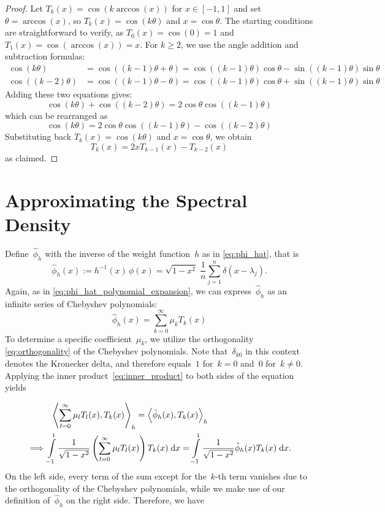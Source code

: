 \begin{proof}
Let $T_k(x) = \cos(k \arccos(x))$ for $x \in [-1, 1]$ and set $\theta = \arccos(x)$, so $\mbox{$T_k(x) = \cos(k\theta)$}$ and $x = \cos\theta$. The starting conditions are straightforward to verify, as $T_0(x) = \cos(0) = 1$ and $T_1(x) = \cos(\arccos(x)) = x$. For $k \geq 2$, we use the angle addition and subtraction formulas:
\begin{align*}
\cos(k\theta) &= \cos((k-1)\theta + \theta) = \cos((k-1)\theta)\cos\theta - \sin((k-1)\theta)\sin\theta \\
\cos((k-2)\theta) &= \cos((k-1)\theta - \theta) = \cos((k-1)\theta)\cos\theta + \sin((k-1)\theta)\sin\theta
\end{align*}
Adding these two equations gives:
\[
\cos(k\theta) + \cos((k-2)\theta) = 2\cos\theta \cos((k-1)\theta)
\]
which can be rearranged as
\[
\cos(k\theta) = 2\cos\theta \cos((k-1)\theta) - \cos((k-2)\theta)
\]
Substituting back $T_k(x) = \cos(k\theta)$ and $x = \cos\theta$, we obtain
\[
T_k(x) = 2x T_{k-1}(x) - T_{k-2}(x)
\]
as claimed.
\end{proof}

\section{Approximating the Spectral Density}
Define~$\hat{\phi}_h$ with the inverse of the weight function~$h$ as in \eqref{eq:phi_hat}, that is
\[
    \hat{\phi}_h(x) := h^{-1}(x) \, \phi(x) = \sqrt{1 - x^2} \; \frac{1}{n} \sum_{j = 1}^n \delta(x - \lambda_j).
\]
Again, as in \eqref{eq:phi_hat_polynomial_expansion}, we can express~$\hat{\phi}_h$ as an infinite series of Chebyshev polynomials:
\[
    \hat{\phi}_h(x) = \sum_{k = 0}^{\infty} \mu_k T_k(x)
\]
To determine a specific coefficient~$\mu_k$, we utilize the orthogonality \eqref{eq:orthogonality} of the Chebyshev polynomials.
Note that~$\delta_{k0}$ in this context denotes the Kronecker delta, and therefore equals~$1$ for~$k = 0$ and~$0$ for~$k \neq 0$. Applying the inner product~\eqref{eq:inner_product} to both sides of the equation yields

\begin{align*}
    & \; \; \left \langle \sum_{l = 0}^{\infty} \mu_l T_l(x), T_k(x) \right \rangle_h = \left \langle \hat{\phi}_h(x), T_k(x) \right \rangle_h \\
    \implies & \int\limits_{-1}^1 \frac{1}{\sqrt{1 - x^2}} \left(\sum_{l = 0}^{\infty} \mu_l T_l(x)\right) T_k(x) \;\mathrm{d}x = \int\limits_{-1}^1 \frac{1}{\sqrt{1 - x^2}} \hat{\phi}_h(x) T_k(x) \;\mathrm{d}x.\\
\end{align*}On the left side, every term of the sum except for the~$k$-th term vanishes due to the orthogonality of the Chebyshev polynomials, while we make use of our definition of~$\hat{\phi}_h$ on the right side. Therefore, we have


